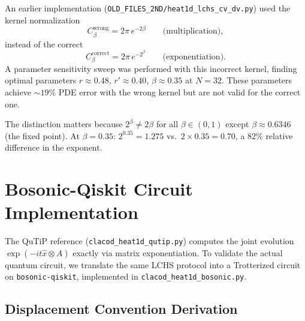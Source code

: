 \documentclass[11pt]{article}
\begin{document}
An earlier implementation (\texttt{OLD\_FILES\_2ND/heat1d\_lchs\_cv\_dv.py})
used the kernel normalization
\begin{equation}
  C_\beta^{\text{wrong}} = 2\pi\,e^{-2\beta}
  \qquad\text{(multiplication)},
\end{equation}
instead of the correct
\begin{equation}
  C_\beta^{\text{correct}} = 2\pi\,e^{-2^\beta}
  \qquad\text{(exponentiation)}.
\end{equation}
A parameter sensitivity sweep was performed with this incorrect kernel,
finding optimal parameters $r \approx 0.48$, $r' \approx 0.40$,
$\beta \approx 0.35$ at $N = 32$.  These parameters achieve
$\sim\!19\%$ PDE error with the wrong kernel but are not valid for the
correct one.

The distinction matters because $2^\beta \neq 2\beta$ for all
$\beta \in (0,1)$ except $\beta \approx 0.6346$ (the fixed point).
At $\beta = 0.35$: $2^{0.35} = 1.275$ vs.\ $2\times0.35 = 0.70$,
a 82\% relative difference in the exponent.

\section{Bosonic-Qiskit Circuit Implementation}\label{sec:bosonic}

The QuTiP reference (\texttt{clacod\_heat1d\_qutip.py}) computes the joint
evolution $\exp(-it\hat{x}\otimes A)$ exactly via matrix exponentiation.
To validate the actual quantum circuit, we translate the same LCHS protocol
into a Trotterized circuit on \texttt{bosonic-qiskit}, implemented in
\texttt{clacod\_heat1d\_bosonic.py}.

\subsection{Displacement Convention Derivation}
\end{document}
